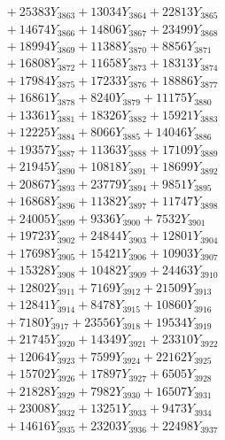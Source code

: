 \documentclass[a4paper,10pt]{article}
\begin{document}
{\begin{align}
&\;  + 25383 Y_{3863} + 13034 Y_{3864} + 22813 Y_{3865} \\[0.3ex]
&\;  + 14674 Y_{3866} + 14806 Y_{3867} + 23499 Y_{3868} \\[0.5ex]\allowbreak
&\;  + 18994 Y_{3869} + 11388 Y_{3870} + 8856 Y_{3871} \\[0.3ex]
&\;  + 16808 Y_{3872} + 11658 Y_{3873} + 18313 Y_{3874} \\[0.3ex]
&\;  + 17984 Y_{3875} + 17233 Y_{3876} + 18886 Y_{3877} \\[0.3ex]
&\;  + 16861 Y_{3878} + 8240 Y_{3879} + 11175 Y_{3880} \\[0.3ex]
&\;  + 13361 Y_{3881} + 18326 Y_{3882} + 15921 Y_{3883} \\[0.3ex]
&\;  + 12225 Y_{3884} + 8066 Y_{3885} + 14046 Y_{3886} \\[0.3ex]
&\;  + 19357 Y_{3887} + 11363 Y_{3888} + 17109 Y_{3889} \\[0.3ex]
&\;  + 21945 Y_{3890} + 10818 Y_{3891} + 18699 Y_{3892} \\[0.3ex]
&\;  + 20867 Y_{3893} + 23779 Y_{3894} + 9851 Y_{3895} \\[0.3ex]
&\;  + 16868 Y_{3896} + 11382 Y_{3897} + 11747 Y_{3898} \\[0.5ex]\allowbreak
&\;  + 24005 Y_{3899} + 9336 Y_{3900} + 7532 Y_{3901} \\[0.3ex]
&\;  + 19723 Y_{3902} + 24844 Y_{3903} + 12801 Y_{3904} \\[0.3ex]
&\;  + 17698 Y_{3905} + 15421 Y_{3906} + 10903 Y_{3907} \\[0.3ex]
&\;  + 15328 Y_{3908} + 10482 Y_{3909} + 24463 Y_{3910} \\[0.3ex]
&\;  + 12802 Y_{3911} + 7169 Y_{3912} + 21509 Y_{3913} \\[0.3ex]
&\;  + 12841 Y_{3914} + 8478 Y_{3915} + 10860 Y_{3916} \\[0.3ex]
&\;  + 7180 Y_{3917} + 23556 Y_{3918} + 19534 Y_{3919} \\[0.3ex]
&\;  + 21745 Y_{3920} + 14349 Y_{3921} + 23310 Y_{3922} \\[0.3ex]
&\;  + 12064 Y_{3923} + 7599 Y_{3924} + 22162 Y_{3925} \\[0.3ex]
&\;  + 15702 Y_{3926} + 17897 Y_{3927} + 6505 Y_{3928} \\[0.5ex]\allowbreak
&\;  + 21828 Y_{3929} + 7982 Y_{3930} + 16507 Y_{3931} \\[0.3ex]
&\;  + 23008 Y_{3932} + 13251 Y_{3933} + 9473 Y_{3934} \\[0.3ex]
&\;  + 14616 Y_{3935} + 23203 Y_{3936} + 22498 Y_{3937} \\[0.3ex]

\end{align}}
\end{document}
